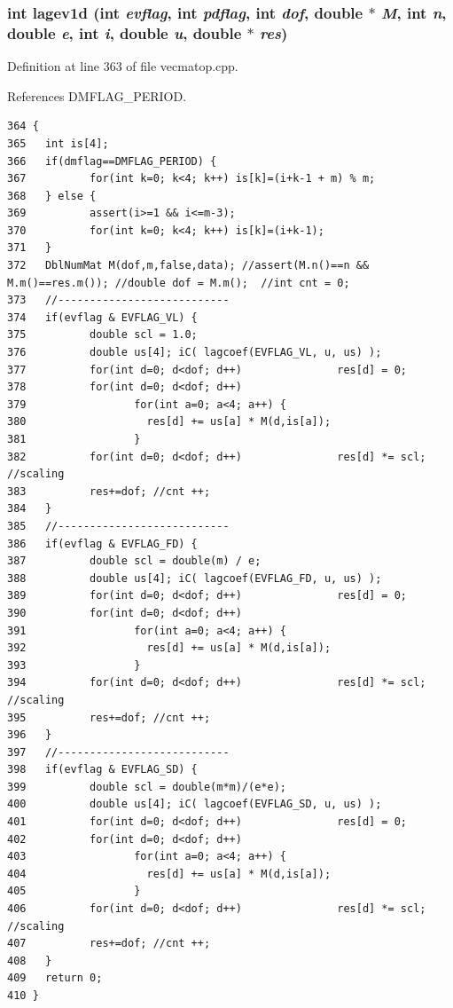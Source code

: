 \subsubsection{\setlength{\rightskip}{0pt plus 5cm}int lagev1d (int {\em evflag}, int {\em pdflag}, int {\em dof}, double $\ast$ {\em M}, int {\em n}, double {\em e}, int {\em i}, double {\em u}, double $\ast$ {\em res})}\label{vecmatop_8hpp_559daf9c86280b25416fa70e8a206c82_559daf9c86280b25416fa70e8a206c82}




Definition at line 363 of file vecmatop.cpp.

References DMFLAG\_\-PERIOD.

\footnotesize\begin{verbatim}364 {
365   int is[4];
366   if(dmflag==DMFLAG_PERIOD) {
367          for(int k=0; k<4; k++) is[k]=(i+k-1 + m) % m;
368   } else {
369          assert(i>=1 && i<=m-3);
370          for(int k=0; k<4; k++) is[k]=(i+k-1);
371   }
372   DblNumMat M(dof,m,false,data); //assert(M.n()==n && M.m()==res.m()); //double dof = M.m();  //int cnt = 0;
373   //---------------------------
374   if(evflag & EVFLAG_VL) {
375          double scl = 1.0;
376          double us[4]; iC( lagcoef(EVFLAG_VL, u, us) );
377          for(int d=0; d<dof; d++)               res[d] = 0;
378          for(int d=0; d<dof; d++) 
379                 for(int a=0; a<4; a++) {
380                   res[d] += us[a] * M(d,is[a]);
381                 }
382          for(int d=0; d<dof; d++)               res[d] *= scl; //scaling
383          res+=dof; //cnt ++;
384   }
385   //---------------------------
386   if(evflag & EVFLAG_FD) {
387          double scl = double(m) / e;
388          double us[4]; iC( lagcoef(EVFLAG_FD, u, us) );
389          for(int d=0; d<dof; d++)               res[d] = 0;
390          for(int d=0; d<dof; d++)
391                 for(int a=0; a<4; a++) {
392                   res[d] += us[a] * M(d,is[a]);
393                 }
394          for(int d=0; d<dof; d++)               res[d] *= scl; //scaling
395          res+=dof; //cnt ++;
396   }
397   //---------------------------
398   if(evflag & EVFLAG_SD) {
399          double scl = double(m*m)/(e*e);
400          double us[4]; iC( lagcoef(EVFLAG_SD, u, us) );
401          for(int d=0; d<dof; d++)               res[d] = 0;
402          for(int d=0; d<dof; d++)
403                 for(int a=0; a<4; a++) {
404                   res[d] += us[a] * M(d,is[a]);
405                 }
406          for(int d=0; d<dof; d++)               res[d] *= scl; //scaling
407          res+=dof; //cnt ++;
408   }
409   return 0;
410 }
\end{verbatim}\normalsize 



